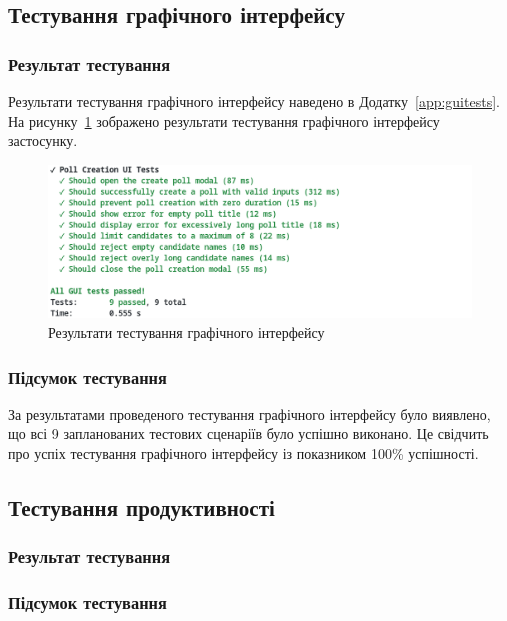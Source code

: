 \documentclass[14pt]{extreport}
\begin{document}
  \subsection{Тестування графічного інтерфейсу}
  
  \subsubsection*{Результат тестування}
  
  Результати тестування графічного інтерфейсу наведено в Додатку~\ref{app:guitests}. На рисунку~\ref{fig:guitests} зображено результати тестування графічного інтерфейсу застосунку.

  \begin{figure}[H]
    \centering
    \includegraphics[width=\textwidth]{GuiTests}
    \caption{Результати тестування графічного інтерфейсу}
    \label{fig:guitests}
  \end{figure}
  
  \subsubsection*{Підсумок тестування}
  
  За результатами проведеного тестування графічного інтерфейсу було виявлено, що всі 9 запланованих тестових сценаріїв було успішно виконано. Це свідчить про успіх тестування графічного інтерфейсу із показником 100\% успішності.
  
  \subsection{Тестування продуктивності}
  
  \subsubsection*{Результат тестування}
  
  \subsubsection*{Підсумок тестування}
  
\end{document}
